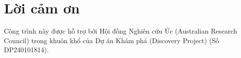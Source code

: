 \section*{Lời cảm ơn}
Công trình này được hỗ trợ bởi Hội đồng Nghiên cứu Úc (Australian Research Council) trong khuôn khổ của Dự án Khám phá (Discovery Project) (Số DP240101814).
